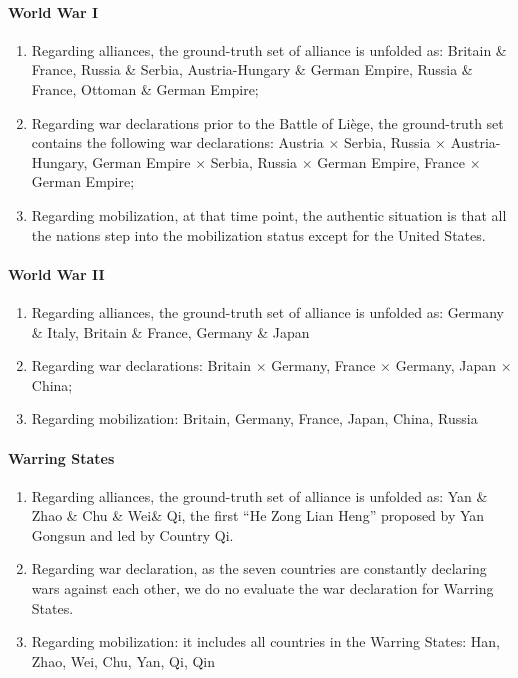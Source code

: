 \documentclass{article}
\begin{document}
\paragraph{World War I}
\begin{enumerate}
    \item Regarding alliances, the ground-truth set of alliance is unfolded as: Britain \& France, Russia \& Serbia, Austria-Hungary \& German Empire, Russia \& France, Ottoman \& German Empire;
    \item Regarding war declarations prior to the Battle of Liège, the ground-truth set contains the following war declarations: Austria $\times$ Serbia, Russia $\times$ Austria-Hungary, German Empire $\times$ Serbia, Russia $\times$ German Empire, France $\times$ German Empire;
    \item Regarding mobilization, at that time point, the authentic situation is that all the nations step into the mobilization status except for the United States.
\end{enumerate}

\paragraph{World War II}
\begin{enumerate}
    \item Regarding alliances, the ground-truth set of alliance is unfolded as: Germany \& Italy, Britain \& France, Germany \& Japan
    \item Regarding war declarations: Britain $\times$ Germany, France $\times$ Germany, Japan $\times$ China;
    \item Regarding mobilization: Britain, Germany, France, Japan, China, Russia
\end{enumerate}

\paragraph{Warring States}
\begin{enumerate}
    \item Regarding alliances, the ground-truth set of alliance is unfolded as: Yan \& Zhao \& Chu \& Wei\& Qi, the first ``He Zong Lian Heng'' proposed by Yan Gongsun and led by Country Qi.
    \item Regarding war declaration, as the seven countries are constantly declaring wars against each other, we do no evaluate the war declaration for Warring States.
    \item Regarding mobilization: it includes all countries in the Warring States: Han, Zhao, Wei, Chu, Yan, Qi, Qin
\end{enumerate}
\end{document}
